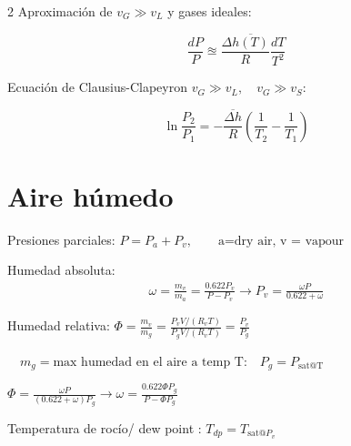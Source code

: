 \documentclass[9pt]{article}
\begin{document}
\begin{multicols}{2}
Aproximación de $v_G\gg v_L$ y gases ideales:

\begin{equation*}
  \frac{dP}{P} \approxeq \frac{\Delta \overline{h(T)}}{R}\frac{dT}{T^2}
\end{equation*}

Ecuación de Clausius-Clapeyron $v_G \gg v_L, \quad v_G \gg v_S$:

\begin{equation*}
  \ln{\frac{P_2}{P_1}}= -\frac{\overline{\Delta h}}{R} \left( \frac{1}{T_2} - \frac{1}{T_1}\right)
\end{equation*}

\clearpage

\section{Aire húmedo}
Presiones parciales: $P = P_a + P_v, \qquad \text{a=dry air, v = vapour}$

Humedad absoluta: 
\begin{gather*}
  \omega = \frac{m_v}{m_a}= \frac{0.622 P_v}{P-P_v}\longrightarrow P_v = \frac{\omega P}{0.622+\omega}  
\end{gather*}


Humedad relativa: $\displaystyle \Phi = \frac{m_v}{m_g}=\frac{P_vV/(R_vT)}{P_gV/(R_vT)}= \frac{P_v}{P_g}$

\vspace{2mm}

$\displaystyle \quad m_g = \text{max humedad en el aire a temp T:} \quad P_g = P_\text{sat@T}$

$\displaystyle \Phi = \frac{\omega P}{(0.622+\omega)P_g} \longrightarrow \omega = \frac{0.622\Phi P_g}{P- \Phi P_g} $







Temperatura de rocío/ dew point : $T_{dp} = T_{\text{sat}@P_v} $



\end{multicols}
\end{document}
